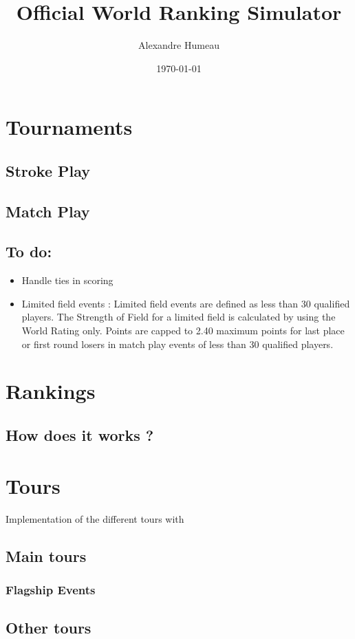 \documentclass{article}
\begin{document}
\title{Official World Ranking Simulator}
\author{Alexandre Humeau}
\date{\today}
\maketitle

\section{Tournaments}
\subsection{Stroke Play}
\subsection{Match Play}

\subsection{To do:}
\begin{itemize}
	\item Handle ties in scoring
	\item Limited field events : Limited field events are defined as less than 30 qualified players. The Strength of Field for a limited field is calculated by using the World Rating only. Points are capped to 2.40 maximum points for last place or first round losers in match play events of less than 30 qualified players.
\end{itemize}

\section{Rankings}
\subsection{How does it works ?}

\section{Tours}

Implementation of the different tours with

\subsection{Main tours}
\subsubsection{Flagship Events}
\subsection{Other tours}
\end{document}
